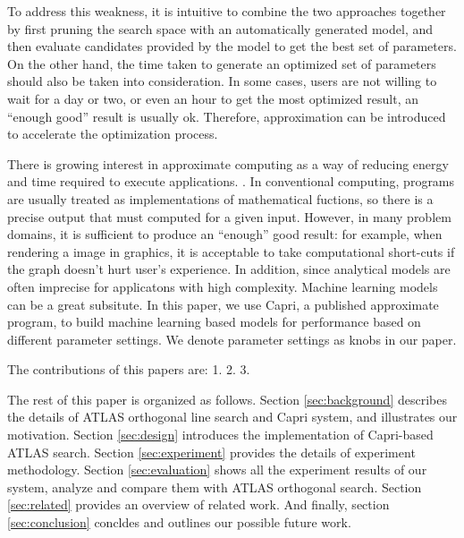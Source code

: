 \par
To address this weakness, it is intuitive to combine the two approaches together by first pruning the search
space with an automatically generated model, and then evaluate candidates
provided by the model to get the best set of parameters.
On the other hand, the time taken to generate an optimized set of parameters
should also be taken into consideration. In some cases, users are not willing
to wait for a day or two, or even an hour to get the most optimized result, an
``enough good'' result is usually ok. Therefore, approximation can be introduced
to accelerate the optimization process.

There is growing interest in approximate computing as a way of reducing energy
and time required to execute applications. \cite{ansel2011language,
baek2010green, sidiroglou2011managing, swaminathan2015case}. In conventional
computing, programs are usually treated as implementations of mathematical
fuctions, so there is a precise output that must computed for a given input.
However, in many problem domains, it is sufficient to produce an ``enough''
good result: for example, when rendering a image in graphics, it is
acceptable to take computational short-cuts if the graph doesn't hurt user's
experience. In addition, since analytical models are often imprecise for
applicatons with high complexity. Machine learning models can be a great
subsitute. In this paper, we use Capri\cite{sui2016proactive}, a published
approximate program, to build machine learning based models for \gem performance
based on different parameter settings. We denote parameter settings as knobs in
our paper.

The contributions of this papers are:
1.
2.
3.

\par
The rest of this paper is organized as follows. Section \ref{sec:background} describes the details of ATLAS
orthogonal line search and Capri system, and illustrates our motivation.
Section \ref{sec:design} introduces the implementation of Capri-based ATLAS search.
Section \ref{sec:experiment} provides the details of experiment methodology.
Section \ref{sec:evaluation} shows all the experiment results of our system, analyze and compare them with ATLAS orthogonal search.
Section \ref{sec:related} provides an overview of related work.
And finally, section \ref{sec:conclusion} concldes and outlines our possible future work.
